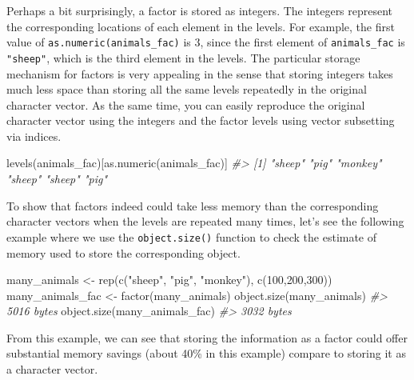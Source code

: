 \documentclass[
]{book}
\newenvironment{Shaded}{\begin{snugshade}}{\end{snugshade}}
\newcommand{\CommentTok}[1]{\textcolor[rgb]{0.56,0.35,0.01}{\textit{#1}}}
\newcommand{\DecValTok}[1]{\textcolor[rgb]{0.00,0.00,0.81}{#1}}
\newcommand{\FunctionTok}[1]{\textcolor[rgb]{0.00,0.00,0.00}{#1}}
\newcommand{\NormalTok}[1]{#1}
\newcommand{\OtherTok}[1]{\textcolor[rgb]{0.56,0.35,0.01}{#1}}
\newcommand{\StringTok}[1]{\textcolor[rgb]{0.31,0.60,0.02}{#1}}
\newenvironment{blackbox}{
  \definecolor{shadecolor}{rgb}{0, 0, 0}  %
  \color{white}
  \begin{shaded}}
 {\end{shaded}}
\newenvironment{infobox}[1]
  {
  \begin{itemize}
  \renewcommand{\labelitemi}{
    \raisebox{-.7\height}[0pt][0pt]{
      {\setkeys{Gin}{width=3em,keepaspectratio}
        \texttt{[image: pics/\#1]}}
    }
  }
  \setlength{\fboxsep}{1em}
  \begin{blackbox}
  \item
  }
  {
  \end{blackbox}
  \end{itemize}
  }
\begin{document}
Perhaps a bit surprisingly, a factor is stored as integers. The integers represent the corresponding locations of each element in the levels. For example, the first value of \texttt{as.numeric(animals\_fac)} is 3, since the first element of \texttt{animals\_fac} is \texttt{"sheep"}, which is the third element in the levels. The particular storage mechanism for factors is very appealing in the sense that storing integers takes much less space than storing all the same levels repeatedly in the original character vector. As the same time, you can easily reproduce the original character vector using the integers and the factor levels using vector subsetting via indices.

\begin{Shaded}
\begin{Highlighting}[]
\FunctionTok{levels}\NormalTok{(animals\_fac)[}\FunctionTok{as.numeric}\NormalTok{(animals\_fac)]}
\CommentTok{\#\textgreater{} [1] "sheep"  "pig"    "monkey" "sheep"  "sheep"  "pig"}
\end{Highlighting}
\end{Shaded}

\begin{infobox}{caution}
To show that factors indeed could take less memory than the corresponding character vectors when the levels are repeated many times, let's see the following example where we use the \texttt{object.size()} function to check the estimate of memory used to store the corresponding object.

\begin{Shaded}
\begin{Highlighting}[]
\NormalTok{many\_animals }\OtherTok{\textless{}{-}} \FunctionTok{rep}\NormalTok{(}\FunctionTok{c}\NormalTok{(}\StringTok{"sheep"}\NormalTok{, }\StringTok{"pig"}\NormalTok{, }\StringTok{"monkey"}\NormalTok{), }\FunctionTok{c}\NormalTok{(}\DecValTok{100}\NormalTok{,}\DecValTok{200}\NormalTok{,}\DecValTok{300}\NormalTok{))}
\NormalTok{many\_animals\_fac }\OtherTok{\textless{}{-}} \FunctionTok{factor}\NormalTok{(many\_animals)}
\FunctionTok{object.size}\NormalTok{(many\_animals)}
\CommentTok{\#\textgreater{} 5016 bytes}
\FunctionTok{object.size}\NormalTok{(many\_animals\_fac)}
\CommentTok{\#\textgreater{} 3032 bytes}
\end{Highlighting}
\end{Shaded}

From this example, we can see that storing the information as a factor could offer substantial memory savings (about 40\% in this example) compare to storing it as a character vector.

\end{infobox}
\end{document}
